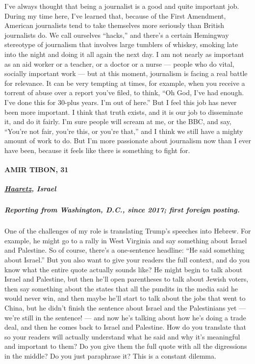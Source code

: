 I've always thought that being a journalist is a good and quite
important job. During my time here, I've learned that, because of the
First Amendment, American journalists tend to take themselves more
seriously than British journalists do. We call ourselves ``hacks,'' and
there's a certain Hemingway stereotype of journalism that involves large
tumblers of whiskey, smoking late into the night and doing it all again
the next day. I am not nearly as important as an aid worker or a
teacher, or a doctor or a nurse --- people who do vital, socially
important work --- but at this moment, journalism is facing a real
battle for relevance. It can be very tempting at times, for example,
when you receive a torrent of abuse over a report you've filed, to
think, ``Oh God, I've had enough. I've done this for 30-plus years. I'm
out of here.'' But I feel this job has never been more important. I
think that truth exists, and it is our job to disseminate it, and do it
fairly. I'm sure people will scream at me, or the BBC, and say, ``You're
not fair, you're this, or you're that,'' and I think we still have a
mighty amount of work to do. But I'm more passionate about journalism
now than I ever have been, because it feels like there is something to
fight for.

\hypertarget{amir-tibon-31}{%
\paragraph{AMIR TIBON, 31}\label{amir-tibon-31}}

\hypertarget{haaretz-israel}{%
\subparagraph{\texorpdfstring{\textbf{\href{https://www.haaretz.com/misc/writers/WRITER-1.4699333}{Haaretz},
Israel}}{Haaretz, Israel}}\label{haaretz-israel}}

\hypertarget{reporting-from-washington-dc-since-2017-first-foreign-posting-4}{%
\subparagraph{\texorpdfstring{\textbf{Reporting from Washington, D.C.,
since 2017; first foreign
posting.}}{Reporting from Washington, D.C., since 2017; first foreign posting.}}\label{reporting-from-washington-dc-since-2017-first-foreign-posting-4}}

One of the challenges of my role is translating Trump's speeches into
Hebrew. For example, he might go to a rally in West Virginia and say
something about Israel and Palestine. So of course, there's a
one-sentence headline: ``He said something about Israel.'' But you also
want to give your readers the full context, and do you know what the
entire quote actually sounds like? He might begin to talk about Israel
and Palestine, but then he'll open parentheses to talk about Jewish
voters, then say something about the states that all the pundits in the
media said he would never win, and then maybe he'll start to talk about
the jobs that went to China, but he didn't finish the sentence about
Israel and the Palestinians yet --- we're still in the sentence! --- and
now he's talking about how he's doing a trade deal, and then he comes
back to Israel and Palestine. How do you translate that so your readers
will actually understand what he said and why it's meaningful and
important to them? Do you give them the full quote with all the
digressions in the middle? Do you just paraphrase it? This is a constant
dilemma.

